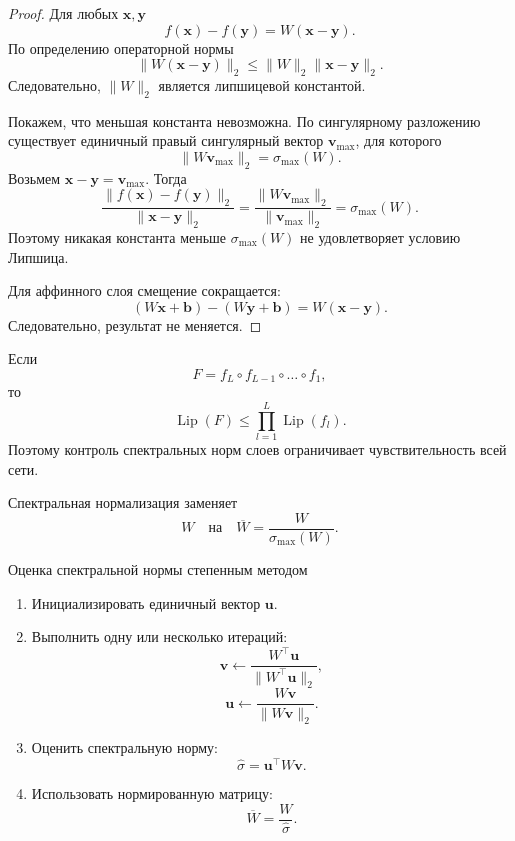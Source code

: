 \documentclass[12pt,a4paper]{article}
\newcommand{\Lip}{\operatorname{Lip}}
\numberwithin{equation}{section}
\theoremstyle{definition}
\theoremstyle{remark}
\begin{document}
\begin{proof}
Для любых \(\bm{x},\bm{y}\)
\[
    f(\bm{x})-f(\bm{y})
    =
    W(\bm{x}-\bm{y}).
\]
По определению операторной нормы
\[
    \|W(\bm{x}-\bm{y})\|_2
    \leq
    \|W\|_2\|\bm{x}-\bm{y}\|_2.
\]
Следовательно, \(\|W\|_2\) является липшицевой константой.

Покажем, что меньшая константа невозможна. По сингулярному разложению
существует единичный правый сингулярный вектор \(\bm{v}_{\max}\), для
которого
\[
    \|W\bm{v}_{\max}\|_2
    =
    \sigma_{\max}(W).
\]
Возьмем \(\bm{x}-\bm{y}=\bm{v}_{\max}\). Тогда
\[
    \frac{
        \|f(\bm{x})-f(\bm{y})\|_2
    }{
        \|\bm{x}-\bm{y}\|_2
    }
    =
    \frac{
        \|W\bm{v}_{\max}\|_2
    }{
        \|\bm{v}_{\max}\|_2
    }
    =
    \sigma_{\max}(W).
\]
Поэтому никакая константа меньше \(\sigma_{\max}(W)\) не удовлетворяет
условию Липшица.

Для аффинного слоя смещение сокращается:
\[
    (W\bm{x}+\bm{b})-(W\bm{y}+\bm{b})
    =
    W(\bm{x}-\bm{y}).
\]
Следовательно, результат не меняется.
\end{proof}

Если
\[
    F=f_L\circ f_{L-1}\circ\ldots\circ f_1,
\]
то
\[
    \Lip(F)
    \leq
    \prod_{l=1}^{L}\Lip(f_l).
\]
Поэтому контроль спектральных норм слоев ограничивает чувствительность
всей сети.

Спектральная нормализация заменяет
\[
    W
    \quad\text{на}\quad
    \overline{W}
    =
    \frac{W}{\sigma_{\max}(W)}.
\]

\begin{algobox}{Оценка спектральной нормы степенным методом}
\begin{enumerate}
    \item Инициализировать единичный вектор \(\bm{u}\).

    \item Выполнить одну или несколько итераций:
    \[
        \bm{v}
        \leftarrow
        \frac{W^\top\bm{u}}
        {\|W^\top\bm{u}\|_2},
    \]
    \[
        \bm{u}
        \leftarrow
        \frac{W\bm{v}}
        {\|W\bm{v}\|_2}.
    \]

    \item Оценить спектральную норму:
    \[
        \widehat{\sigma}
        =
        \bm{u}^\top W\bm{v}.
    \]

    \item Использовать нормированную матрицу:
    \[
        \overline{W}=\frac{W}{\widehat{\sigma}}.
    \]
\end{enumerate}
\end{algobox}
\end{document}
